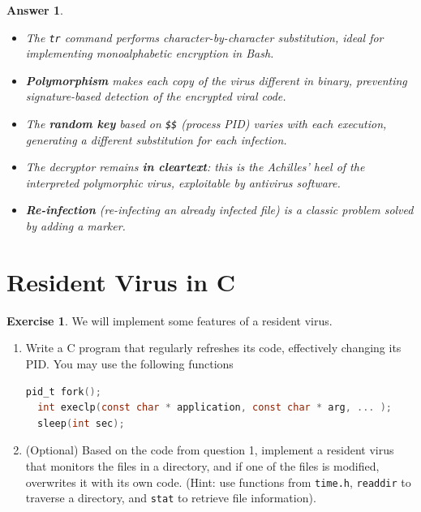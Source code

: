 \documentclass[a4paper,11pt]{article}
\theoremstyle{plain}
\newtheorem{correction}{Answer}
\theoremstyle{definition}
\newtheorem{exercice}{Exercise}
\begin{document}
\begin{correction}
\begin{pointcle}
\begin{itemize}
    \item The \texttt{tr} command performs character-by-character substitution, ideal for implementing monoalphabetic encryption in Bash.
    \item \textbf{Polymorphism} makes each copy of the virus different in binary, preventing signature-based detection of the encrypted viral code.
    \item The \textbf{random key} based on \texttt{\$\$} (process PID) varies with each execution, generating a different substitution for each infection.
    \item The decryptor remains \textbf{in cleartext}: this is the Achilles' heel of the interpreted polymorphic virus, exploitable by antivirus software.
    \item \textbf{Re-infection} (re-infecting an already infected file) is a classic problem solved by adding a marker.
\end{itemize}
\end{pointcle}

\end{correction}


\section{Resident Virus in C}


\begin{exercice} We will implement some features of a resident virus.
\begin{enumerate}
\item Write a C program that regularly refreshes its code, effectively changing its PID. You may use the following functions
\begin{lstlisting}[language=C,numbers=none]
  pid_t fork();
  int execlp(const char * application, const char * arg, ... );
  sleep(int sec);
\end{lstlisting}
\item (Optional) Based on the code from question 1, implement a resident virus that monitors the files in a directory, and if one of the files is modified, overwrites it with its own code. (Hint: use functions from \texttt{time.h}, \texttt{readdir} to traverse a directory, and \texttt{stat} to retrieve file information).
\end{enumerate}
\end{exercice}
\end{document}
